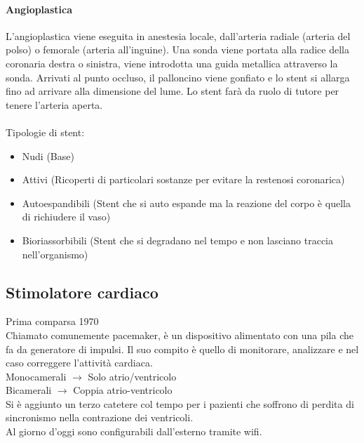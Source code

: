 \documentclass[a4paper]{article}
\begin{document}
\paragraph{Angioplastica}
L’angioplastica viene eseguita in anestesia locale, dall'arteria radiale 
(arteria del polso) o femorale (arteria all'inguine). Una sonda viene 
portata alla radice della coronaria destra o sinistra, viene introdotta
una guida metallica attraverso la sonda. Arrivati al punto occluso, il
palloncino viene gonfiato e lo stent si allarga fino ad arrivare alla 
dimensione del lume. Lo stent farà da ruolo di tutore per tenere l'arteria
aperta.
\\ \\
Tipologie di stent:
\begin{itemize}
    \item Nudi (Base)
    \item Attivi (Ricoperti di particolari sostanze per evitare la 
    restenosi coronarica)
    \item Autoespandibili (Stent che si auto espande ma la reazione del corpo
    è quella di richiudere il vaso)
    \item Bioriassorbibili (Stent che si degradano nel tempo e non lasciano
    traccia nell'organismo)
\end{itemize}

\subsection{Stimolatore cardiaco}
Prima comparsa 1970 \\
Chiamato comunemente pacemaker, è un dispositivo alimentato con una pila
che fa da generatore di impulsi. Il suo compito è quello di monitorare,
analizzare e nel caso correggere l'attività cardiaca. \\
Monocamerali $\to$ Solo atrio/ventricolo \\
Bicamerali $\to$ Coppia atrio-ventricolo \\
Si è aggiunto un terzo catetere col tempo per i pazienti che soffrono di 
perdita di sincronismo nella contrazione dei ventricoli. \\ Al giorno d'oggi
sono configurabili dall'esterno tramite wifi.
\end{document}
